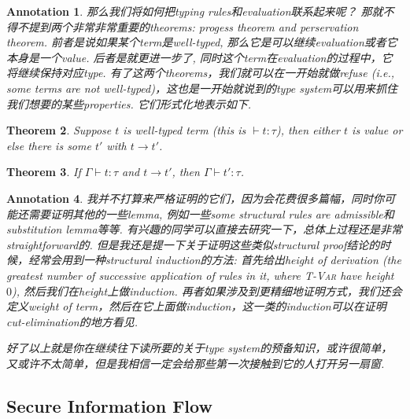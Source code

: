 \documentclass{article}
\newtheorem{theorem}{Theorem}[section]
\newtheorem{annotation}[theorem]{Annotation}
\newcommand{\termtype}[2]{\ensuremath{#1:#2}}
\begin{document}
\begin{annotation}
\rm 那么我们将如何把typing rules和evaluation联系起来呢？ 那就不得不提到两个非常非常重要的theorems: \emph{progess theorem} and \emph{perservation theorem}. 前者是说如果某个term是well-typed, 那么它是可以继续evaluation或者它本身是一个value. 后者是就更进一步了, 同时这个term在evaluation的过程中，它将继续保持对应type. 有了这两个theorems，我们就可以在一开始就做refuse (i.e., some terms are not well-typed)，这也是一开始就说到的type system可以用来抓住我们想要的某些properties. 它们形式化地表示如下.
\end{annotation}

\begin{theorem}
\rm Suppose $t$ is well-typed term (this is $\vdash \termtype{t}{\tau}$), then either $t$ is value or else there is some $t'$ with $t \to t'$. 
\end{theorem}

\begin{theorem}
\rm If $\Gamma \vdash \termtype{t}{\tau}$ and $t \to t'$, then $\Gamma \vdash \termtype{t'}{\tau}$. 
\end{theorem}

\begin{annotation}
\rm 我并不打算来严格证明的它们，因为会花费很多篇幅，同时你可能还需要证明其他的一些lemma, 例如一些some structural rules are admissible和substitution lemma等等. 有兴趣的同学可以直接去研究一下，总体上过程还是非常straightforward的. 但是我还是提一下关于证明这些类似structural proof结论的时候，经常会用到一种structural induction的方法: 首先给出height of derivation (the greatest number of successive application of rules in it, where \textsc{T-Var} have height $0$), 然后我们在height上做induction. 再者如果涉及到更精细地证明方式，我们还会定义weight of term，然后在它上面做induction，这一类的induction可以在证明cut-elimination的地方看见. 

好了以上就是你在继续往下读所要的关于type system的预备知识，或许很简单，又或许不太简单，但是我相信一定会给那些第一次接触到它的人打开另一扇窗. 
\end{annotation}

\subsection{Secure Information Flow}
\end{document}
